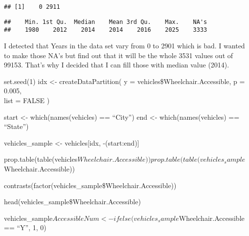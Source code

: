 \documentclass[
]{article}
\newenvironment{Shaded}{\begin{snugshade}}{\end{snugshade}}
\newcommand{\DecValTok}[1]{\textcolor[rgb]{0.00,0.00,0.81}{#1}}
\newcommand{\FunctionTok}[1]{\textcolor[rgb]{0.13,0.29,0.53}{\textbf{#1}}}
\newcommand{\NormalTok}[1]{#1}
\newcommand{\OtherTok}[1]{\textcolor[rgb]{0.56,0.35,0.01}{#1}}
\newcommand{\SpecialCharTok}[1]{\textcolor[rgb]{0.81,0.36,0.00}{\textbf{#1}}}
\newcommand{\StringTok}[1]{\textcolor[rgb]{0.31,0.60,0.02}{#1}}
\begin{document}
\begin{verbatim}
## [1]    0 2911
\end{verbatim}

\begin{Shaded}
\end{Shaded}

\begin{verbatim}
##    Min. 1st Qu.  Median    Mean 3rd Qu.    Max.    NA's 
##    1980    2012    2014    2014    2016    2025    3333
\end{verbatim}

I detected that Years in the data set vary from 0 to 2901 which is bad.
I wanted to make those NA's but find out that it will be the whole 3531
values out of 99153. That's why I decided that I can fill those with
median value (2014).

set.seed(1) idx \textless- createDataPartition( y =
vehicles\$Wheelchair.Accessible, p = 0.005,\\
list = FALSE )

start \textless- which(names(vehicles) == ``City'') end \textless-
which(names(vehicles) == ``State'')

vehicles\_sample \textless- vehicles{[}idx, -(start:end){]}

prop.table(table(vehicles\(Wheelchair.Accessible))
prop.table(table(vehicles_sample\)Wheelchair.Accessible))

contrasts(factor(vehicles\_sample\$Wheelchair.Accessible))

head(vehicles\_sample\$Wheelchair.Accessible)

vehicles\_sample\(AccessibleNum <- ifelse(vehicles_sample\)Wheelchair.Accessible
== ``Y'', 1, 0)
\end{document}
